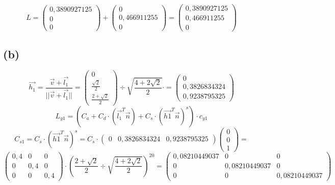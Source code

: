 \documentclass{article}
\begin{document}
\[
L=
\begin{pmatrix}
0,3890927125\\0\\0
\end{pmatrix}+
\begin{pmatrix}
0\\0,466911255\\0
\end{pmatrix}=
\begin{pmatrix}
0,3890927125\\0,466911255\\0
\end{pmatrix}
\]

\subsection*{(b)}
\[
\overrightarrow{h_1}=\frac{\overrightarrow{v}+\overrightarrow{l_1}}{||\overrightarrow{v}+\overrightarrow{l_1}||}=
\begin{pmatrix}
0\\ \frac{\sqrt{2}}{2}\\ \frac{2+\sqrt{2}}{2}
\end{pmatrix} \div \sqrt{\frac{4+2\sqrt2}{2}}\cdot=
\begin{pmatrix}
0\\ 0,3826834324\\0,9238795325
\end{pmatrix}
\]
\[
L_{y1} = (C_a + C_d\cdot(\overrightarrow{l_1}^T\overrightarrow{n})+C_s\cdot(\overrightarrow{h1}^T\overrightarrow{n})^s)\cdot c_{y1}
\]
\[
C_{s1}=C_s\cdot(\overrightarrow{h1}^T\overrightarrow{n})^s= C_s\cdot
\begin{pmatrix}
0& 0,3826834324&0,9238795325
\end{pmatrix}
\begin{pmatrix}
0\\ 0\\ 1
\end{pmatrix}=
\]
\[
\begin{pmatrix}
0,4 & 0 & 0\\
0 & 0,4 & 0\\
0 & 0 & 0,4
\end{pmatrix}\cdot (\frac{2+\sqrt{2}}{2} \div \sqrt{\frac{4+2\sqrt2}{2}})^{20}=
\begin{pmatrix}
0,08210449037 & 0 & 0\\
0 & 0,08210449037 & 0\\
0 & 0 & 0,08210449037
\end{pmatrix}\]
\end{document}
